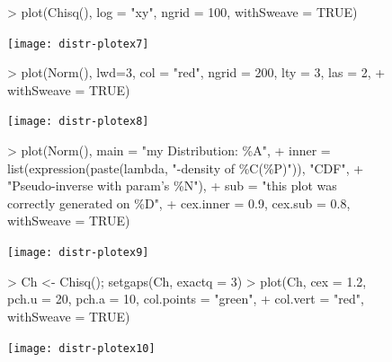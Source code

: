 \documentclass[11pt]{article}
\begin{document}
\begin{figure}[p]
\begin{Schunk}
\begin{Sinput}
> plot(Chisq(), log = "xy", ngrid = 100, withSweave = TRUE)
\end{Sinput}
\end{Schunk}
\texttt{[image: distr-plotex7]}
\end{figure}

\begin{figure}[p]
\begin{Schunk}
\begin{Sinput}
> plot(Norm(), lwd=3, col = "red", ngrid = 200, lty = 3, las = 2,
+      withSweave = TRUE)
\end{Sinput}
\end{Schunk}
\texttt{[image: distr-plotex8]}
\end{figure}

\begin{figure}[p]
\begin{Schunk}
\begin{Sinput}
> plot(Norm(), main = "my Distribution: \%A",
+      inner = list(expression(paste(lambda, "-density of \%C(\%P)")), "CDF",
+                   "Pseudo-inverse with param's \%N"),
+      sub = "this plot was correctly generated on \%D",
+      cex.inner = 0.9, cex.sub = 0.8, withSweave = TRUE)
\end{Sinput}
\end{Schunk}
\texttt{[image: distr-plotex9]}
\end{figure}

\begin{figure}[p]
\begin{Schunk}
\begin{Sinput}
> Ch <- Chisq(); setgaps(Ch, exactq = 3)
> plot(Ch, cex = 1.2, pch.u = 20, pch.a = 10, col.points = "green",
+      col.vert = "red", withSweave = TRUE)
\end{Sinput}
\end{Schunk}
\texttt{[image: distr-plotex10]}
\end{figure}
\end{document}
